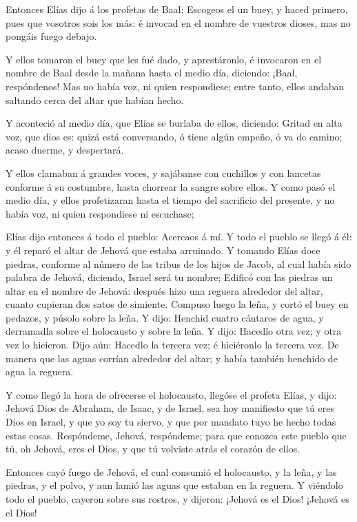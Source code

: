  Entonces Elías dijo á los profetas de Baal: Escogeos el un
buey, y haced primero, pues que vosotros sois los más: é invocad en el
nombre de vuestros dioses, mas no pongáis fuego debajo.

 Y ellos tomaron el buey que les fué dado, y aprestáronlo,
é invocaron en el nombre de Baal desde la mañana hasta el medio día,
diciendo: ¡Baal, respóndenos! Mas no había voz, ni quien respondiese;
entre tanto, ellos andaban saltando cerca del altar que habían hecho.

 Y aconteció al medio día, que Elías se burlaba de ellos,
diciendo: Gritad en alta voz, que dios es: quizá está conversando, ó
tiene algún empeño, ó va de camino; acaso duerme, y despertará.

 Y ellos clamaban á grandes voces, y sajábanse con
cuchillos y con lancetas conforme á su costumbre, hasta chorrear la
sangre sobre ellos.  Y como pasó el medio día, y ellos
profetizaran hasta el tiempo del sacrificio del presente, y no había
voz, ni quien respondiese ni escuchase;

 Elías dijo entonces á todo el pueblo: Acercaos á mí. Y
todo el pueblo se llegó á él: y él reparó el altar de Jehová que estaba
arruinado.  Y tomando Elías doce piedras, conforme al
número de las tribus de los hijos de Jacob, al cual había sido palabra
de Jehová, diciendo, Israel será tu nombre;  Edificó con
las piedras un altar en el nombre de Jehová: después hizo una reguera
alrededor del altar, cuanto cupieran dos satos de simiente.
 Compuso luego la leña, y cortó el buey en pedazos, y
púsolo sobre la leña.  Y dijo: Henchid cuatro cántaros de
agua, y derramadla sobre el holocausto y sobre la leña. Y dijo: Hacedlo
otra vez; y otra vez lo hicieron. Dijo aún: Hacedlo la tercera vez; é
hiciéronlo la tercera vez.  De manera que las aguas corrían
alrededor del altar; y había también henchido de agua la reguera.

 Y como llegó la hora de ofrecerse el holocausto, llegóse
el profeta Elías, y dijo: Jehová Dios de Abraham, de Isaac, y de Israel,
sea hoy manifiesto que tú eres Dios en Israel, y que yo soy tu siervo, y
que por mandato tuyo he hecho todas estas cosas. 
Respóndeme, Jehová, respóndeme; para que conozca este pueblo que tú, oh
Jehová, eres el Dios, y que tú volviste atrás el corazón de ellos.

 Entonces cayó fuego de Jehová, el cual consumió el
holocausto, y la leña, y las piedras, y el polvo, y aun lamió las aguas
que estaban en la reguera.  Y viéndolo todo el pueblo,
cayeron sobre sus rostros, y dijeron: ¡Jehová es el Dios! ¡Jehová es el
Dios!

